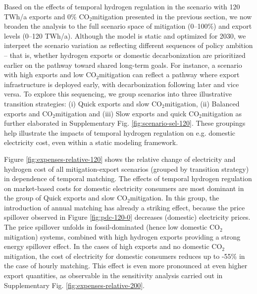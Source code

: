 \documentclass[5p,numafflabel]{elsarticle}
\newcommand{\co}{\ce{CO2}~}
\def\co{CO${}_2${\:}}
\begin{document}

Based on the effects of temporal hydrogen regulation in the scenario with 120 TWh/a exports and 0\% \co mitigation presented in the previous section, we now broaden the analysis to the full scenario space of mitigation (0–100\%) and export levels (0–120 TWh/a).
Although the model is static and optimized for 2030, we interpret the scenario variation as reflecting different sequences of policy ambition -- that is, whether hydrogen exports or domestic decarbonization are prioritized earlier on the pathway toward shared long-term goals. For instance, a scenario with high exports and low \co mitigation can reflect a pathway where export infrastructure is deployed early, with decarbonization following later and vice versa.
To explore this sequencing, we group scenarios into three illustrative transition strategies: 
(i) Quick exports and slow \co mitigation,
(ii) Balanced exports and \co mitigation and
(iii) Slow exports and quick \co mitigation as further elaborated in Supplementary Fig. \ref{fig:scenario-sel-120}.
These groupings help illustrate the impacts of temporal hydrogen regulation on e.g. domestic electricity cost, even within a static modeling framework.

Figure \ref{fig:expenses-relative-120} shows the relative change of electricity and hydrogen cost of all mitigation-export scenarios (grouped by transition strategy) in dependence of temporal matching. 
The effects of temporal hydrogen regulation on market-based costs for domestic electricity consumers are most dominant in the group of Quick exports and slow \co mitigation.
In this group, the introduction of annual matching has already a striking effect, because the price spillover observed in Figure \ref{fig:pdc-120-0} decreases (domestic) electricity prices. The price spillover unfolds in fossil-dominated (hence low domestic \co mitigation) systems, combined with high hydrogen exports providing a strong energy spillover effect. In the cases of high exports and no domestic \co mitigation, the cost of electricity for domestic consumers reduces up to -55\% in the case of hourly matching.
This effect is even more pronounced at even higher export quantities, as observable in the sensitivity analysis carried out in Supplementary Fig. \ref{fig:expenses-relative-200}.
\end{document}
